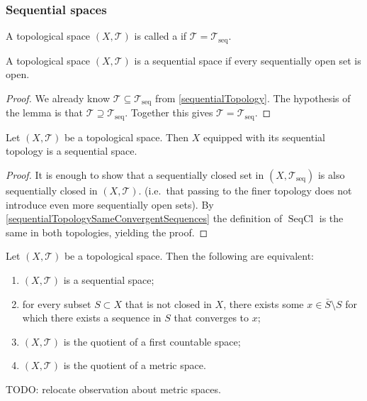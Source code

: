 \subsubsection{Sequential spaces}
\begin{definition}
A topological space $(X,\mathcal{T})$ is called a  if $\mathcal{T} = \mathcal{T}_\text{seq}$.
\end{definition}

\begin{lemma}
A topological space $(X,\mathcal{T})$ is a sequential space if every sequentially open set is open.
\end{lemma}
\begin{proof}
We already know $\mathcal{T} \subseteq \mathcal{T}_\text{seq}$ from \ref{sequentialTopology}. The hypothesis of the lemma is that $\mathcal{T} \supseteq \mathcal{T}_\text{seq}$. Together this gives $\mathcal{T} = \mathcal{T}_\text{seq}$.
\end{proof}

\begin{lemma}
Let $(X,\mathcal{T})$ be a topological space. Then $X$ equipped with its sequential topology is a sequential space.
\end{lemma}
\begin{proof}
It is enough to show that a sequentially closed set in $(X,\mathcal{T}_\text{seq})$ is also sequentially closed in $(X,\mathcal{T})$. (i.e.\ that passing to the finer topology does not introduce even more sequentially open sets). By \ref{sequentialTopologySameConvergentSequences} the definition of $\operatorname{SeqCl}$ is the same in both topologies, yielding the proof.
\end{proof}

\begin{proposition}
Let $(X,\mathcal{T})$ be a topological space. Then the following are equivalent:
\begin{enumerate}
\item $(X,\mathcal{T})$ is a sequential space;
\item for every subset $S\subset X$ that is not closed in $X$, there exists some $x\in \bar{S}\setminus S$ for which there exists a sequence in $S$ that converges to $x$;
\item $(X,\mathcal{T})$ is the quotient of a first countable space;
\item $(X,\mathcal{T})$ is the quotient of a metric space.
\end{enumerate}
\end{proposition}
TODO: relocate observation about metric spaces.

